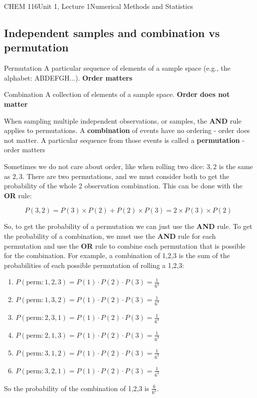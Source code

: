 \documentclass{article}
\begin{document}
\begin{tdoc}{CHEM 116}{Unit 1, Lecture 1}{Numerical Methods and Statistics}
\subsection{Independent samples and combination vs permutation}

\begin{description}
  \item{Permutation} A particular sequence of elements of a sample space (e.g., the alphabet: ABDEFGH...).  \textbf{Order matters}
  \item{Combination} A collection of elements of a sample space. \textbf{Order does not matter}
\end{description}

When sampling multiple independent observations, or samples, the {\bf
  AND} rule applies to permutations. A {\bf combination} of events
have no ordering - order does not matter. A particular sequence from
those events is called a {\bf permutation} - order
matters\vspace{0.2cm}

Sometimes we do not care about order, like when rolling two dice:
$3,2$ is the same as $2,3$. There are two permutations, and we must
consider both to get the probability of the whole 2 observation
combination. This can be done with the {\bf OR} rule:

\begin{equation}
P(3,2) = P(3)\times P(2) + P(2) \times P(3) = 2\times P(3)\times P(2)
\end{equation}

So, to get the probability of a permutation we can just use the {\bf
  AND} rule. To get the probability of a combination, we must use the
{\bf AND} rule for each permutation and use the {\bf OR} rule to
combine each permutation that is possible for the combination. For
example, a combination of 1,2,3 is the sum of the probabilities of
each possible permutation of rolling a 1,2,3:
\begin{enumerate}
\item $P(\textrm{perm}: 1,2,3) = P(1)\cdot P(2) \cdot P(3) = \frac{1}{6^3}$
\item $P(\textrm{perm}: 1,3,2) = P(1)\cdot P(2) \cdot P(3) = \frac{1}{6^3}$
\item $P(\textrm{perm}: 2,3,1) = P(1)\cdot P(2) \cdot P(3) = \frac{1}{6^3}$
\item $P(\textrm{perm}: 2,1,3) = P(1)\cdot P(2) \cdot P(3) = \frac{1}{6^3}$
\item $P(\textrm{perm}: 3,1,2) = P(1)\cdot P(2) \cdot P(3) = \frac{1}{6^3}$
\item $P(\textrm{perm}: 3,2,1) = P(1)\cdot P(2) \cdot P(3) = \frac{1}{6^3}$
\end{enumerate}
So the probability of the combination of 1,2,3 is
$\frac{6}{6^3}$.


\end{tdoc}
\end{document}
